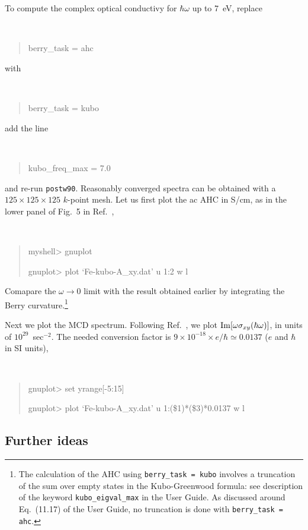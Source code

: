 \documentclass[a4paper,11pt,twoside]{article}
\begin{document}
To compute the complex optical conductivy for $\hbar\omega$
up to 7~eV, replace 
{\tt
\begin{quote}
berry\_task = ahc
\end{quote} }
%
with
%
{\tt
\begin{quote}
berry\_task = kubo
\end{quote} }
%
add the line
%
{\tt
\begin{quote}
kubo\_freq\_max = 7.0
\end{quote} }
%
and re-run {\tt postw90}. Reasonably converged spectra can be
obtained with a $125\times 125\times 125$ $k$-point mesh. Let us first
plot the ac AHC in S/cm, as in the lower panel of Fig.~5 in
Ref.~\cite{yao-prl04}, {\tt
\begin{quote}
myshell> gnuplot

gnuplot> plot `Fe-kubo-A\_xy.dat' u 1:2 w l
\end{quote} }

Comapare the $\omega\rightarrow 0$ limit with the result obtained
earlier by integrating the Berry curvature.\footnote{The calculation
  of the AHC using {\tt berry\_task = kubo} involves a truncation of
  the sum over empty states in the Kubo-Greenwood formula: see
  description of the keyword {\tt kubo\_eigval\_max} in the User
  Guide. As discussed around Eq.~(11.17) of the User Guide, no
  truncation is done with {\tt berry\_task = ahc}.}


Next we plot the MCD spectrum. Following Ref.~\cite{yao-prl04}, we
plot ${\rm Im}[\omega\sigma_{xy}(\hbar\omega)]$, in units of
$10^{29}$~sec$^{-2}$. The needed conversion factor is $9\times
10^{-18}\times e/\hbar\simeq 0.0137$ ($e$ and $\hbar$ in SI units),
{\tt
\begin{quote}
gnuplot> set yrange[-5:15]

gnuplot> plot `Fe-kubo-A\_xy.dat' u 1:(\$1)*(\$3)*0.0137 w l
\end{quote} }

\subsection*{Further ideas}
\end{document}
